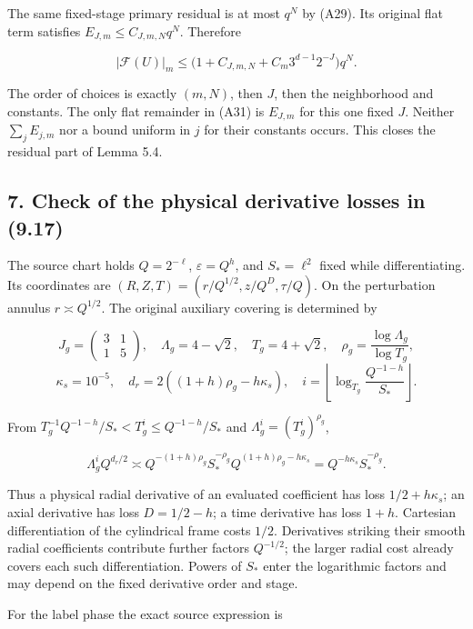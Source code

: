 \documentclass[10pt,a4paper]{article}
\begin{document}
The same fixed-stage primary residual is at most \(q^N\) by (A29). Its original flat term satisfies \(E_{J,m}\le C_{J,m,N}q^N\). Therefore

\[
|\mathcal F(U)|_m
\le\big(1+C_{J,m,N}+C_m3^{d-1}2^{-J}\big)q^N.
\tag{A31}
\]

The order of choices is exactly \((m,N)\), then \(J\), then the neighborhood and constants. The only flat remainder in (A31) is \(E_{J,m}\) for this one fixed \(J\). Neither \(\sum_jE_{j,m}\) nor a bound uniform in \(j\) for their constants occurs. This closes the residual part of Lemma 5.4.

\subsection{7. Check of the physical derivative losses in (9.17)}\label{check-of-the-physical-derivative-losses-in-9.17}

The source chart holds \(Q=2^{-\ell}\), \(\varepsilon=Q^h\), and \(S_*=\ell^2\) fixed while differentiating. Its coordinates are \((R,Z,T)=(r/Q^{1/2},z/Q^D,\tau/Q)\). On the perturbation annulus \(r\asymp Q^{1/2}\). The original auxiliary covering is determined by

\[
J_g=\begin{pmatrix}3&1\\1&5\end{pmatrix},\quad
\Lambda_g=4-\sqrt2,\quad T_g=4+\sqrt2,\quad
\rho_g=\frac{\log\Lambda_g}{\log T_g},
\] \[
\kappa_s=10^{-5},\quad d_r=2((1+h)\rho_g-h\kappa_s),\quad
i=\left\lfloor\log_{T_g}\frac{Q^{-1-h}}{S_*}\right\rfloor.
\]

From \(T_g^{-1}Q^{-1-h}/S_*<T_g^i\le Q^{-1-h}/S_*\) and \(\Lambda_g^i=(T_g^i)^{\rho_g}\),

\[
\Lambda_g^iQ^{d_r/2}\asymp
Q^{-(1+h)\rho_g}S_*^{-\rho_g}
Q^{(1+h)\rho_g-h\kappa_s}
=Q^{-h\kappa_s}S_*^{-\rho_g}.
\tag{A32}
\]

Thus a physical radial derivative of an evaluated coefficient has loss \(1/2+h\kappa_s\); an axial derivative has loss \(D=1/2-h\); a time derivative has loss \(1+h\). Cartesian differentiation of the cylindrical frame costs \(1/2\). Derivatives striking their smooth radial coefficients contribute further factors \(Q^{-1/2}\); the larger radial cost already covers each such differentiation. Powers of \(S_*\) enter the logarithmic factors and may depend on the fixed derivative order and stage.

For the label phase the exact source expression is
\end{document}
